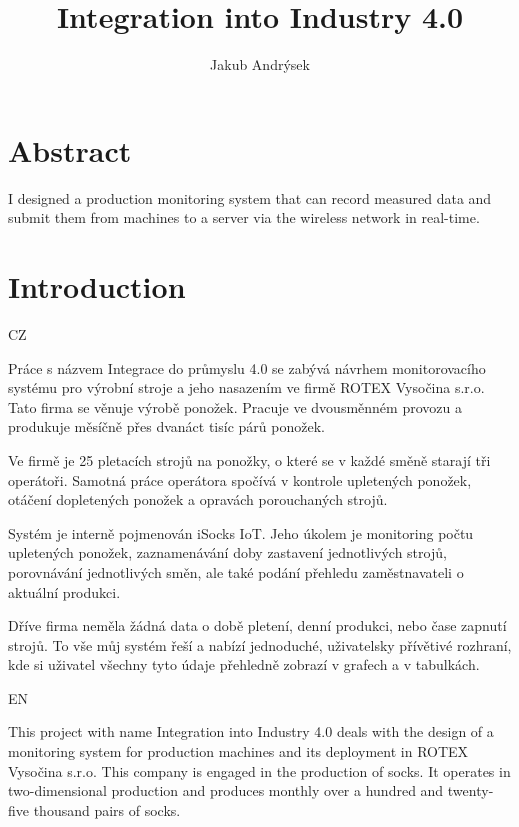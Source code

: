 \documentclass[12pt, a4paper]{article}
\title{Integration into Industry 4.0}
\author{Jakub Andrýsek}
\date{}
\begin{document}

\maketitle

\section*{Abstract}
I designed a production monitoring system that can record measured data and submit them from machines to a server via the wireless network in real-time.



\section*{Introduction}

CZ

Práce s názvem Integrace do průmyslu 4.0 se zabývá návrhem monitorovacího systému pro výrobní stroje a jeho nasazením ve firmě ROTEX Vysočina s.r.o.
Tato firma se věnuje výrobě ponožek.
Pracuje ve dvousměnném provozu a produkuje měsíčně přes dvanáct tisíc párů ponožek.

Ve firmě je 25 pletacích strojů na ponožky, o které se v každé směně starají tři operátoři.
Samotná práce operátora spočívá v kontrole upletených ponožek, otáčení dopletených ponožek a opravách porouchaných strojů.

Systém je interně pojmenován iSocks IoT.
Jeho úkolem je monitoring počtu upletených ponožek, zaznamenávání doby zastavení jednotlivých strojů, porovnávání jednotlivých směn, ale také podání přehledu zaměstnavateli o aktuální produkci.

Dříve firma neměla žádná data o době pletení, denní  produkci, nebo čase zapnutí strojů.
To vše  můj systém řeší  a nabízí jednoduché, uživatelsky přívětivé rozhraní, kde si uživatel všechny tyto údaje přehledně zobrazí v grafech a v tabulkách.

EN

This project with name Integration into Industry 4.0 deals with the design of a monitoring system for production machines and its deployment in ROTEX Vysočina s.r.o.
This company is engaged in the production of socks.
It operates in two-dimensional production and produces monthly over a hundred and twenty-five thousand pairs of socks.
\end{document}
